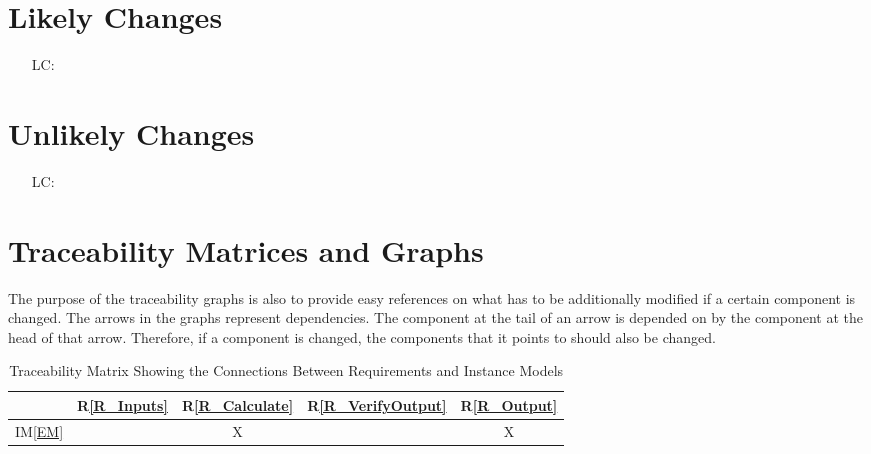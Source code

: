\documentclass[12pt]{article}
\newcommand{\iref}[1]{IM\ref{#1}}
\newcommand{\rref}[1]{R\ref{#1}}
\newcounter{lcnum} %
\begin{document}

\section{Likely Changes}    
\label{sec:lc}
\noindent \begin{itemize}

\item[LC\refstepcounter{lcnum}\thelcnum\label{LC_meaningfulLabel}:] 

\end{itemize}

\section{Unlikely Changes}    
\label{sec:uc}
\noindent \begin{itemize}

\item[LC\refstepcounter{lcnum}\thelcnum\label{LC_meaningfulLabel}:] 

\end{itemize}

\section{Traceability Matrices and Graphs}
\label{sec:tmg}
The purpose of the traceability graphs is also to provide easy references on what has to be additionally modified if a certain component is changed. The arrows in the graphs represent dependencies. The component at the tail of an arrow is depended on by the component at the head of that arrow. Therefore, if a
component is changed, the components that it points to should also be
changed.

\begin{table}[h!]
\centering
\begin{tabular}{|c|c|c|c|c|}
\hline
	& \rref{R_Inputs}& \rref{R_Calculate}& \rref{R_VerifyOutput} & \rref{R_Output} \\
\hline
\iref{EM}            &  & X& &X \\ \hline


\hline
\end{tabular}
\caption{Traceability Matrix Showing the Connections Between Requirements and Instance Models}
\label{Table:R_trace}
\end{table}
\end{document}
